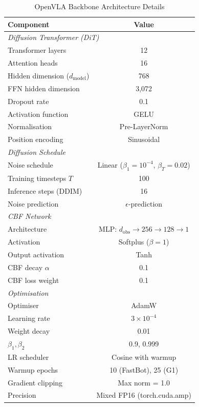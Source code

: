 \documentclass[conference]{IEEEtran}
\begin{document}
\begin{table}[h]
\centering
\caption{OpenVLA Backbone Architecture Details}
\begin{tabular}{@{}lc@{}}
\toprule
\textbf{Component} & \textbf{Value} \\
\midrule
\multicolumn{2}{l}{\textit{Diffusion Transformer (DiT)}} \\
\quad Transformer layers & 12 \\
\quad Attention heads & 16 \\
\quad Hidden dimension ($d_\text{model}$) & 768 \\
\quad FFN hidden dimension & 3{,}072 \\
\quad Dropout rate & 0.1 \\
\quad Activation function & GELU \\
\quad Normalisation & Pre-LayerNorm \\
\quad Position encoding & Sinusoidal \\
\midrule
\multicolumn{2}{l}{\textit{Diffusion Schedule}} \\
\quad Noise schedule & Linear ($\beta_1{=}10^{-4}$, $\beta_T{=}0.02$) \\
\quad Training timesteps $T$ & 100 \\
\quad Inference steps (DDIM) & 16 \\
\quad Noise prediction & $\epsilon$-prediction \\
\midrule
\multicolumn{2}{l}{\textit{CBF Network}} \\
\quad Architecture & MLP: $d_\text{obs} \to 256 \to 128 \to 1$ \\
\quad Activation & Softplus ($\beta = 1$) \\
\quad Output activation & Tanh \\
\quad CBF decay $\alpha$ & 0.1 \\
\quad CBF loss weight & 0.1 \\
\midrule
\multicolumn{2}{l}{\textit{Optimisation}} \\
\quad Optimiser & AdamW \\
\quad Learning rate & $3 \times 10^{-4}$ \\
\quad Weight decay & 0.01 \\
\quad $\beta_1, \beta_2$ & 0.9, 0.999 \\
\quad LR scheduler & Cosine with warmup \\
\quad Warmup epochs & 10 (FastBot), 25 (G1) \\
\quad Gradient clipping & Max norm = 1.0 \\
\quad Precision & Mixed FP16 (torch.cuda.amp) \\
\bottomrule
\end{tabular}
\end{table}
\end{document}
